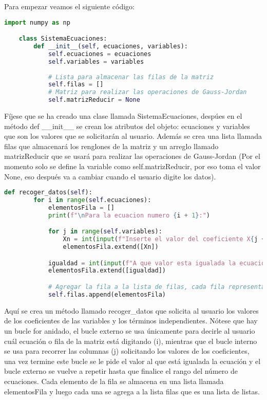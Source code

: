 \documentclass[letterpaper,12pt]{article}
\begin{document}
Para empezar veamos el siguiente código:
\\
\begin{lstlisting}[style=jupyter, language=Python, caption={Atributos de la clase}]
    import numpy as np

    class SistemaEcuaciones:
        def __init__(self, ecuaciones, variables):
            self.ecuaciones = ecuaciones
            self.variables = variables
            
            # Lista para almacenar las filas de la matriz
            self.filas = []
            # Matriz para realizar las operaciones de Gauss-Jordan
            self.matrizReducir = None
    \end{lstlisting}

    Fíjese que se ha creado una clase llamada \textcolor{jl_keyword}{SistemaEcuaciones},
    despúes en el método \textcolor{jl_keyword}{def \_\_init\_\_} se crean los atributos del objeto: \textcolor{jl_keyword}{ecuaciones} y \textcolor{jl_keyword}{variables}
    que son los valores que se solicitarán al usuario.
    Además se crea una lista llamada \textcolor{jl_keyword}{filas} que almacenará 
    los renglones de la matriz y un arreglo llamado \textcolor{jl_keyword}{matrizReducir}
    que se usará para realizar las operaciones de Gauss-Jordan (Por el momento solo se define la variable como self.matrizReducir, por eso toma el valor \textcolor{jl_keyword}{None}, eso después va a cambiar cuando el usuario digite los datos).
    \\
    \begin{lstlisting}[style=jupyter, language=Python, caption={Método para recoger los datos}]
    def recoger_datos(self):
        for i in range(self.ecuaciones):
            elementosFila = []
            print(f"\nPara la ecuacion numero {i + 1}:")

            for j in range(self.variables):
                Xn = int(input(f"Inserte el valor del coeficiente X{j + 1}: "))
                elementosFila.extend([Xn])

            igualdad = int(input(f"A que valor esta igualada la ecuacion?: "))
            elementosFila.extend([igualdad])

            # Agregar la fila a la lista de filas, cada fila representa un solo elemento de la lista
            self.filas.append(elementosFila)
        \end{lstlisting}
Aquí se crea un método llamado \textcolor{jl_keyword}{recoger\_datos} que solicita al usuario los valores de los coeficientes de las variables y los términos independientes.
Nótese que hay un bucle for anidado, el bucle externo se usa únicamente para decirle al usuario 
cuál ecuación o fila de la matriz está digitando (i), mientras que el bucle interno se usa para recorrer las columnas (j)
solicitando los valores de los coeficientes, una vez termine este bucle se le pide el valor al que está igualada la ecuación
y el bucle externo se vuelve a repetir hasta que finalice el rango del número de ecuaciones.
Cada elemento de la fila se almacena en una lista llamada \textcolor{jl_keyword}{elementosFila} y luego cada una se agrega a la lista \textcolor{jl_keyword}{filas} que es una lista de listas.
\\
\end{document}
